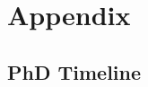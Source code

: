 
\chapter*{Appendix} \label{sec:appendix}


\section*{PhD Timeline} \label{sec:appendix:timeline}


